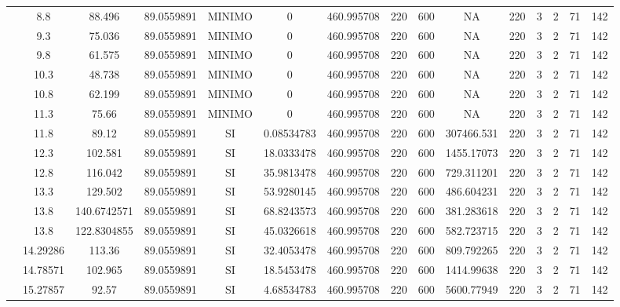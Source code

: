\begin{table}[H]
{\begin{tabular}{|c|c|c|c|c|c|c|c|c|c|c|c|c|c|c|}
\cline{2-15}    & 8.8 & 88.496 & 89.0559891 & MINIMO & 0   & 460.995708 & 220 & 600 & NA  & 220 & 3   & 2   & 71  & 142 \bigstrut\\
\cline{2-15}    & 9.3 & 75.036 & 89.0559891 & MINIMO & 0   & 460.995708 & 220 & 600 & NA  & 220 & 3   & 2   & 71  & 142 \bigstrut\\
\cline{2-15}    & 9.8 & 61.575 & 89.0559891 & MINIMO & 0   & 460.995708 & 220 & 600 & NA  & 220 & 3   & 2   & 71  & 142 \bigstrut\\
\cline{2-15}    & 10.3 & 48.738 & 89.0559891 & MINIMO & 0   & 460.995708 & 220 & 600 & NA  & 220 & 3   & 2   & 71  & 142 \bigstrut\\
\cline{2-15}    & 10.8 & 62.199 & 89.0559891 & MINIMO & 0   & 460.995708 & 220 & 600 & NA  & 220 & 3   & 2   & 71  & 142 \bigstrut\\
\cline{2-15}    & 11.3 & 75.66 & 89.0559891 & MINIMO & 0   & 460.995708 & 220 & 600 & NA  & 220 & 3   & 2   & 71  & 142 \bigstrut\\
\cline{2-15}    & 11.8 & 89.12 & 89.0559891 & SI  & 0.08534783 & 460.995708 & 220 & 600 & 307466.531 & 220 & 3   & 2   & 71  & 142 \bigstrut\\
\cline{2-15}    & 12.3 & 102.581 & 89.0559891 & SI  & 18.0333478 & 460.995708 & 220 & 600 & 1455.17073 & 220 & 3   & 2   & 71  & 142 \bigstrut\\
\cline{2-15}    & 12.8 & 116.042 & 89.0559891 & SI  & 35.9813478 & 460.995708 & 220 & 600 & 729.311201 & 220 & 3   & 2   & 71  & 142 \bigstrut\\
\cline{2-15}    & 13.3 & 129.502 & 89.0559891 & SI  & 53.9280145 & 460.995708 & 220 & 600 & 486.604231 & 220 & 3   & 2   & 71  & 142 \bigstrut\\
\cline{2-15}    & 13.8 & 140.6742571 & 89.0559891 & SI  & 68.8243573 & 460.995708 & 220 & 600 & 381.283618 & 220 & 3   & 2   & 71  & 142 \bigstrut\\
\cline{2-15}    & 13.8 & 122.8304855 & 89.0559891 & SI  & 45.0326618 & 460.995708 & 220 & 600 & 582.723715 & 220 & 3   & 2   & 71  & 142 \bigstrut\\
\cline{2-15}    & 14.29286 & 113.36 & 89.0559891 & SI  & 32.4053478 & 460.995708 & 220 & 600 & 809.792265 & 220 & 3   & 2   & 71  & 142 \bigstrut\\
\cline{2-15}    & 14.78571 & 102.965 & 89.0559891 & SI  & 18.5453478 & 460.995708 & 220 & 600 & 1414.99638 & 220 & 3   & 2   & 71  & 142 \bigstrut\\
\cline{2-15}    & 15.27857 & 92.57 & 89.0559891 & SI  & 4.68534783 & 460.995708 & 220 & 600 & 5600.77949 & 220 & 3   & 2   & 71  & 142 \bigstrut\\

\end{tabular}}
\end{table}
